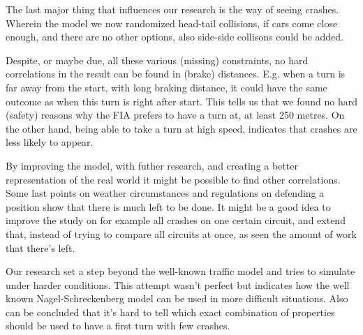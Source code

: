 The last major thing that influences our research is the way of seeing crashes. Wherein the model we now randomized head-tail collisions, if cars come close enough, and there are no other options, also side-side collisons could be added.

Despite, or maybe due, all these various (missing) constraints, no hard correlations in the result can be found in (brake) distances. E.g. when a turn is far away from the start, with long braking distance, it could have the same outcome as when this turn is right after start. This tells us that we found no hard (safety) reasons why the FIA prefers to have a turn at, at least 250 metres. On the other hand, being able to take a turn at high speed, indicates that crashes are less likely to appear.

By improving the model, with futher research, and creating a better representation of the real world it might be possible to find other correlations. Some last points on weather circumstances and regulations on defending a position show that there is much left to be done. It might be a good idea to improve the study on for example all crashes on one certain circuit, and extend that, instead of trying to compare all circuits at once, as seen the amount of work that there's left.

Our research set a step beyond the well-known traffic model and tries to simulate under harder conditions. This attempt wasn't perfect but indicates how the well known Nagel-Schreckenberg model can be used in more difficult situations. Also can be concluded that it's hard to tell which exact combination of properties should be used to have a first turn with few crashes.
